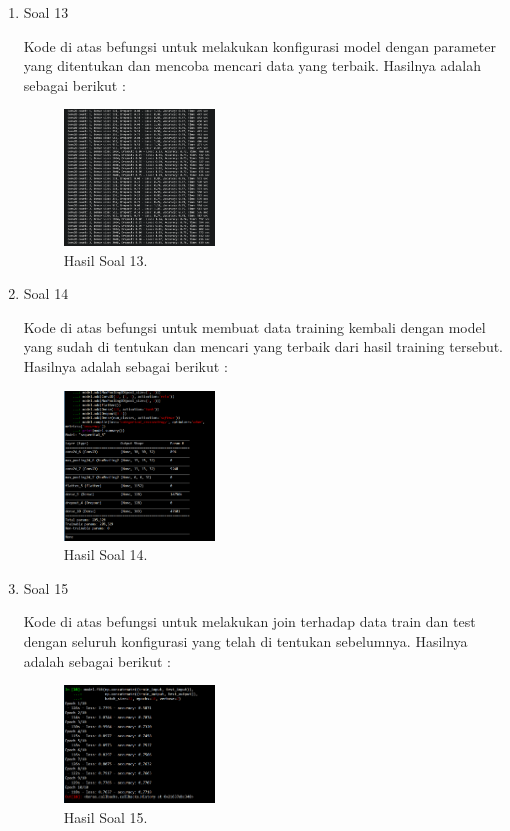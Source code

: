 \begin{enumerate}
	\item Soal 13
	\hfill\break
	
	Kode di atas befungsi untuk melakukan konfigurasi model dengan parameter yang ditentukan dan mencoba mencari data yang terbaik. Hasilnya adalah sebagai berikut :  
	\begin{figure}[H]
	\centering
		\includegraphics[width=4cm]{figures/1174070/7/materi/hasil13.PNG}
		\caption{Hasil Soal 13.}
	\end{figure}

	\item Soal 14
	\hfill\break
	
	Kode di atas befungsi untuk membuat data training kembali dengan model yang sudah di tentukan dan mencari yang terbaik dari hasil training tersebut. Hasilnya adalah sebagai berikut :  
	\begin{figure}[H]
	\centering
		\includegraphics[width=4cm]{figures/1174070/7/materi/hasil14.PNG}
		\caption{Hasil Soal 14.}
	\end{figure}

	\item Soal 15
	\hfill\break
	
	Kode di atas befungsi untuk melakukan join terhadap data train dan test dengan seluruh konfigurasi yang telah di tentukan sebelumnya. Hasilnya adalah sebagai berikut :  
	\begin{figure}[H]
	\centering
		\includegraphics[width=4cm]{figures/1174070/7/materi/hasil15.PNG}
		\caption{Hasil Soal 15.}
	\end{figure}


\end{enumerate}
